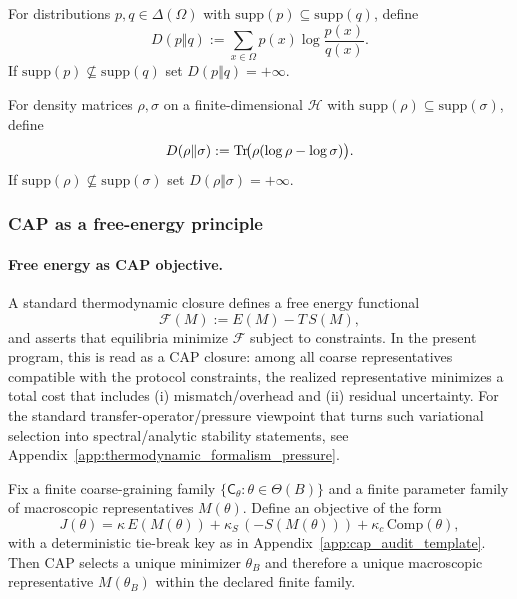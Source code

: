 \begin{definition}\label{def:z128_classical_relative_entropy}
\MathTag For distributions $p,q\in\Delta(\Omega)$ with $\mathrm{supp}(p)\subseteq \mathrm{supp}(q)$, define
\[
D(p\Vert q):=\sum_{x\in\Omega} p(x)\log\frac{p(x)}{q(x)}.
\]
If $\mathrm{supp}(p)\not\subseteq \mathrm{supp}(q)$ set $D(p\Vert q)=+\infty$.
\end{definition}

\begin{definition}\label{def:z128_quantum_relative_entropy}
\MathTag For density matrices $\rho,\sigma$ on a finite-dimensional $\mathcal{H}$ with $\mathrm{supp}(\rho)\subseteq \mathrm{supp}(\sigma)$, define
\[
D(\rho\Vert\sigma):=\mathrm{Tr}\!\bigl(\rho(\log\rho-\log\sigma)\bigr).
\]
If $\mathrm{supp}(\rho)\not\subseteq \mathrm{supp}(\sigma)$ set $D(\rho\Vert\sigma)=+\infty$.
\end{definition}

\subsubsection{CAP as a free-energy principle}
\label{subsec:cap_free_energy}

\paragraph{Free energy as CAP objective.}
\InterfaceTag A standard thermodynamic closure defines a free energy functional
\[
\mathcal{F}(M):=E(M)-T\,S(M),
\]
and asserts that equilibria minimize $\mathcal{F}$ subject to constraints.
In the present program, this is read as a CAP closure:
among all coarse representatives compatible with the protocol constraints, the realized representative minimizes a total cost that includes (i) mismatch/overhead and (ii) residual uncertainty.
For the standard transfer-operator/pressure viewpoint that turns such variational selection into spectral/analytic stability statements, see Appendix~\ref{app:thermodynamic_formalism_pressure}.

\begin{proposition}
\label{prop:cap_free_energy_closure}
Fix a finite coarse-graining family $\{\mathsf{C}_\theta:\theta\in\Theta(B)\}$ and a finite parameter family of macroscopic representatives $M(\theta)$.
Define an objective of the form
\[
J(\theta)=\kappa\,E(M(\theta))+\kappa_S\,(-S(M(\theta)))+\kappa_c\,\mathrm{Comp}(\theta),
\]
with a deterministic tie-break key as in Appendix~\ref{app:cap_audit_template}.
Then CAP selects a unique minimizer $\theta_B$ and therefore a unique macroscopic representative $M(\theta_B)$ within the declared finite family.
\end{proposition}

